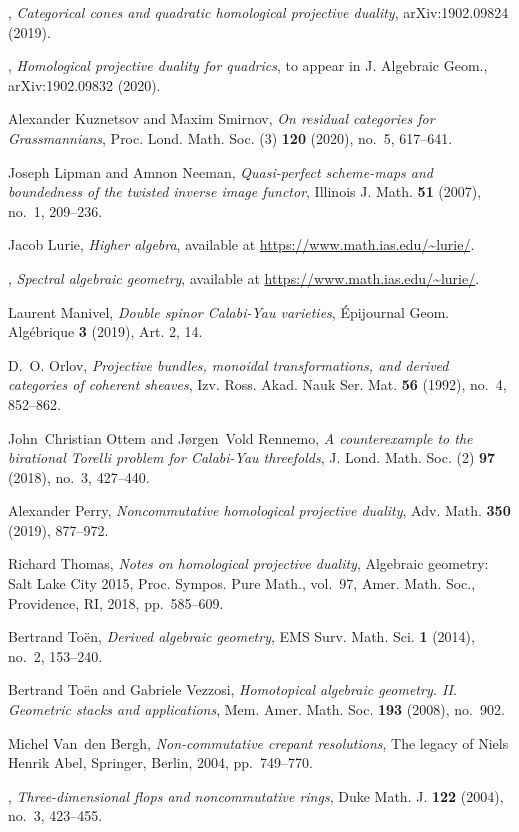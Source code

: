 \documentclass[11pt, reqno]{amsart}
\numberwithin{equation}{section}
\theoremstyle{plain}
\theoremstyle{definition}
\begin{document}
\begin{thebibliography}{10}
\bysame, \emph{Categorical cones and quadratic homological projective duality},
  arXiv:1902.09824 (2019).

\bysame, \emph{Homological projective duality for quadrics}, to appear in J.
  Algebraic Geom., arXiv:1902.09832 (2020).

Alexander Kuznetsov and Maxim Smirnov, \emph{On residual categories for
  {G}rassmannians}, Proc. Lond. Math. Soc. (3) \textbf{120} (2020), no.~5,
  617--641.

Joseph Lipman and Amnon Neeman, \emph{Quasi-perfect scheme-maps and boundedness
  of the twisted inverse image functor}, Illinois J. Math. \textbf{51} (2007),
  no.~1, 209--236.

Jacob Lurie, \emph{Higher algebra}, available at
  \url{https://www.math.ias.edu/~lurie/}.

\bysame, \emph{Spectral algebraic geometry}, available at
  \url{https://www.math.ias.edu/~lurie/}.

Laurent Manivel, \emph{Double spinor {C}alabi-{Y}au varieties}, \'{E}pijournal
  Geom. Alg\'{e}brique \textbf{3} (2019), Art. 2, 14.

D.~O. Orlov, \emph{Projective bundles, monoidal transformations, and derived
  categories of coherent sheaves}, Izv. Ross. Akad. Nauk Ser. Mat. \textbf{56}
  (1992), no.~4, 852--862.

John~Christian Ottem and J\o rgen~Vold Rennemo, \emph{A counterexample to the
  birational {T}orelli problem for {C}alabi-{Y}au threefolds}, J. Lond. Math.
  Soc. (2) \textbf{97} (2018), no.~3, 427--440.

Alexander Perry, \emph{Noncommutative homological projective duality}, Adv.
  Math. \textbf{350} (2019), 877--972.

Richard Thomas, \emph{Notes on homological projective duality}, Algebraic
  geometry: {S}alt {L}ake {C}ity 2015, Proc. Sympos. Pure Math., vol.~97, Amer.
  Math. Soc., Providence, RI, 2018, pp.~585--609.

Bertrand To\"{e}n, \emph{Derived algebraic geometry}, EMS Surv. Math. Sci.
  \textbf{1} (2014), no.~2, 153--240.

Bertrand To\"{e}n and Gabriele Vezzosi, \emph{Homotopical algebraic geometry.
  {II}. {G}eometric stacks and applications}, Mem. Amer. Math. Soc.
  \textbf{193} (2008), no.~902.

Michel Van~den Bergh, \emph{Non-commutative crepant resolutions}, The legacy of
  {N}iels {H}enrik {A}bel, Springer, Berlin, 2004, pp.~749--770.

\bysame, \emph{Three-dimensional flops and noncommutative rings}, Duke Math. J.
  \textbf{122} (2004), no.~3, 423--455.

\end{thebibliography}

\end{document}
